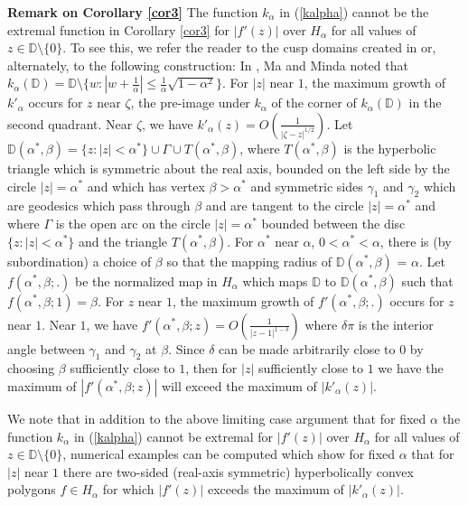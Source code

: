 \documentclass[final]{siamltex}
\newcommand{\D}{\mathbb{D}}
\begin{document}
\noindent \textbf{Remark on Corollary \ref{cor3}} The function $k_{\alpha}$ in (\ref{kalpha}) cannot be the extremal function in Corollary \ref{cor3} for $|f'(z)|$ over $H_{\alpha}$ for all values of $z \in \D \setminus\{0\}$.  To see this, we refer the reader to the cusp domains created in \cite{MP00} or, alternately, to the following construction: In \cite{MM99}, Ma and Minda noted that $k_{\alpha}(\D) = \D \setminus \{w : |w + \frac{1}{\alpha}| \le \frac{1}{\alpha}\sqrt{1-\alpha^2}\}$.  For $|z|$ near $1$, the maximum growth of $k'_{\alpha}$ occurs for $z$ near $\zeta$, the pre-image under $k_{\alpha}$ of the corner of $k_{\alpha}(\D)$ in the second quadrant.  Near $\zeta$, we have $k'_{\alpha}(z)= O(\frac{1}{|\zeta - z|^{1/2}})$.  Let $\D(\alpha^{*},\beta) = \{z : |z| < \alpha^{*}\} \cup \Gamma \cup T(\alpha^{*},\beta)$, where $T(\alpha^{*},\beta)$ is the hyperbolic triangle which is symmetric about the real axis, bounded on the left side by the circle $|z| = \alpha^{*}$ and which has  vertex $\beta > \alpha^{*}$ and symmetric sides $\gamma_1$ and $\gamma_2$ which are geodesics which pass through $\beta$ and are tangent to the circle $|z| = \alpha^{*}$ and where $\Gamma$ is the open arc on the circle $|z| = \alpha^{*}$ bounded between the disc $\{z : |z|< \alpha^{*}\}$ and the triangle $T(\alpha^{*},\beta)$.  For $\alpha^{*}$ near $\alpha$, $0 < \alpha^{*} < \alpha$, there is (by subordination) a choice of $\beta$ so that the mapping radius of $\D(\alpha^{*},\beta)$ = $\alpha$.  Let $f(\alpha^{*},\beta;.)$ be the normalized map in $H_{\alpha}$ which maps $\D$ to $\D(\alpha^{*},\beta)$ such that $f(\alpha^{*},\beta;1) = \beta$.  For $z$ near $1$, the maximum growth of $f'(\alpha^{*},\beta;.)$ occurs for $z$ near $1$.  Near $1$, we have $f'(\alpha^{*},\beta;z)=O(\frac{1}{|z-1|^{1-\delta}})$ where $\delta\pi$ is the interior angle between $\gamma_1$ and $\gamma_2$ at $\beta$.  Since $\delta$ can be made arbitrarily close to $0$ by choosing $\beta$ sufficiently close to $1$, then for $|z|$ sufficiently close to $1$ we have the maximum of $|f'(\alpha^{*},\beta;z)|$ will exceed the maximum of $|k'_{\alpha}(z)|$.  

We note that in addition to the above limiting case argument that for fixed $\alpha$ the function $k_{\alpha}$ in (\ref{kalpha}) cannot be extremal for $|f'(z)|$ over $H_{\alpha}$ for all values of $z \in \D \setminus\{0\}$, numerical examples can be computed which show for fixed $\alpha$ that for $|z|$ near $1$ there are two-sided (real-axis symmetric) hyperbolically convex polygons $f \in H_{\alpha}$ for which $|f'(z)|$ exceeds the maximum of $|k'_{\alpha}(z)|$.  
\end{document}
